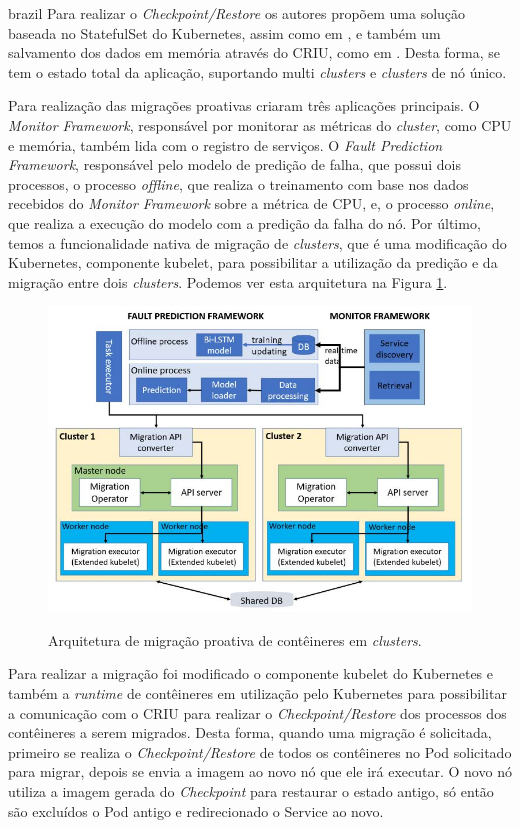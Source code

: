 \begin{otherlanguage*}{brazil}
Para realizar o \textit{Checkpoint/Restore} os autores propõem uma solução
baseada no StatefulSet do Kubernetes, assim como em \cite{vayghan2021kubernetes},
e também um salvamento dos dados em memória através do CRIU, como em
\cite{muller2022architecture}. Desta forma, se tem o estado total da aplicação,
suportando multi \textit{clusters} e \textit{clusters} de nó único.

Para realização das migrações proativas criaram três aplicações
principais. O \textit{Monitor Framework}, responsável por monitorar as métricas
do \textit{cluster}, como CPU e memória, também lida com o registro de serviços.
O \textit{Fault Prediction Framework}, responsável pelo modelo de predição
de falha, que possui dois processos, o processo \textit{offline}, que realiza
o treinamento com base nos dados recebidos do \textit{Monitor Framework} sobre
a métrica de CPU, e, o processo \textit{online}, que realiza a execução do
modelo com a predição da falha do nó. Por último, temos a funcionalidade
nativa de migração de \textit{clusters}, que é uma modificação do Kubernetes,
componente kubelet, para possibilitar a utilização da predição e da migração
entre dois \textit{clusters}. Podemos ver esta arquitetura na Figura \ref{fig:proactive}.

\begin{figure}[h]
\centering
\caption{Arquitetura de migração proativa de contêineres em \textit{clusters}.}
\includegraphics[scale=0.54]{images/proactive-architecture.png}
\label{fig:proactive}
\end{figure}

Para realizar a migração foi modificado o componente kubelet do Kubernetes e
também a \textit{runtime} de contêineres em utilização pelo Kubernetes para
possibilitar a comunicação com o CRIU para realizar o \textit{Checkpoint/Restore}
dos processos dos contêineres a serem migrados. Desta forma, quando uma migração
é solicitada, primeiro se realiza o \textit{Checkpoint/Restore} de todos os
contêineres no Pod solicitado para migrar, depois se envia a imagem ao novo nó
que ele irá executar. O novo nó utiliza a imagem gerada do \textit{Checkpoint}
para restaurar o estado antigo, só então são excluídos o Pod antigo e
redirecionado o Service ao novo.


\end{otherlanguage*}
